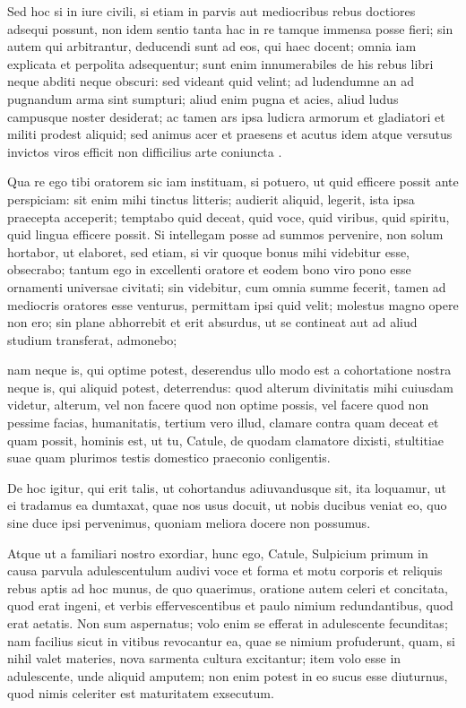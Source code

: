  Sed hoc si in iure civili, si etiam in parvis aut mediocribus rebus doctiores adsequi possunt, non idem sentio tanta hac in re tamque immensa posse fieri; sin autem qui arbitrantur, deducendi sunt ad eos, qui haec docent; omnia iam explicata et perpolita adsequentur; sunt enim innumerabiles de his rebus libri neque abditi neque obscuri: sed videant quid velint; ad ludendumne an ad pugnandum arma sint sumpturi; aliud enim pugna et acies, aliud ludus campusque noster desiderat; ac tamen ars ipsa ludicra armorum et gladiatori et militi prodest aliquid; sed animus acer et praesens et acutus idem atque versutus invictos viros efficit non difficilius arte coniuncta .

 Qua re ego tibi oratorem sic iam instituam, si potuero, ut quid efficere possit ante perspiciam: sit enim mihi tinctus litteris; audierit aliquid, legerit, ista ipsa praecepta acceperit; temptabo quid deceat, quid voce, quid viribus, quid spiritu, quid lingua efficere possit. Si intellegam posse ad summos pervenire, non solum hortabor, ut elaboret, sed etiam, si vir quoque bonus mihi videbitur esse, obsecrabo; tantum ego in excellenti oratore et eodem bono viro pono esse ornamenti universae civitati; sin videbitur, cum omnia summe fecerit, tamen ad mediocris oratores esse venturus, permittam ipsi quid velit; molestus magno opere non ero; sin plane abhorrebit et erit absurdus, ut se contineat aut ad aliud studium transferat, admonebo;

 nam neque is, qui optime potest, deserendus ullo modo est a cohortatione nostra neque is, qui aliquid potest, deterrendus: quod alterum divinitatis mihi cuiusdam videtur, alterum, vel non facere quod non optime possis, vel facere quod non pessime facias, humanitatis, tertium vero illud, clamare contra quam deceat et quam possit, hominis est, ut tu, Catule, de quodam clamatore dixisti, stultitiae suae quam plurimos testis domestico praeconio conligentis.

 De hoc igitur, qui erit talis, ut cohortandus adiuvandusque sit, ita loquamur, ut ei tradamus ea dumtaxat, quae nos usus docuit, ut nobis ducibus veniat eo, quo sine duce ipsi pervenimus, quoniam meliora docere non possumus.

 Atque ut a familiari nostro exordiar, hunc ego, Catule, Sulpicium primum in causa parvula adulescentulum audivi voce et forma et motu corporis et reliquis rebus aptis ad hoc munus, de quo quaerimus, oratione autem celeri et concitata, quod erat ingeni, et verbis effervescentibus et paulo nimium redundantibus, quod erat aetatis. Non sum aspernatus; volo enim se efferat in adulescente fecunditas; nam facilius sicut in vitibus revocantur ea, quae se nimium profuderunt, quam, si nihil valet materies, nova sarmenta cultura excitantur; item volo esse in adulescente, unde aliquid amputem; non enim potest in eo sucus esse diuturnus, quod nimis celeriter est maturitatem exsecutum.

